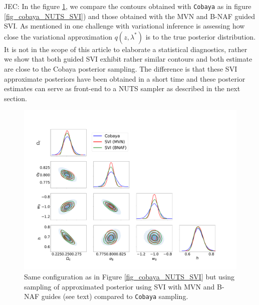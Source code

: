 \documentclass[twocolumn,twocolappendix,nofootinbib,iop]{openjournal}
\newcommand{\JEC}[1]{{\color{magenta}JEC: #1}}
\begin{document}
\JEC{
In the figure \ref{fig_cobaya_SVIs}, we compare the contours obtained with \texttt{Cobaya} as in figure \ref{fig_cobaya_NUTS_SVI}) and those obtained with the MVN and B-NAF guided SVI.  As mentioned in \cite{NEURIPS2020_7cac11e2} one challenge with variational inference is assessing how close the variational approximation $q(z,\lambda^\ast)$ is to the true posterior distribution. It is not in the scope of this article to elaborate a statistical diagnostics, rather we show that both guided SVI exhibit rather similar contours and both estimate are close to the Cobaya posterior sampling. The difference is that these SVI approximate posteriors have been obtained in a short time and these posterior estimates can serve as front-end to a NUTS sampler as described in the next section.} 
%
\begin{figure}
\centering
\includegraphics[width=1.5\columnwidth]{figures/fig_Cobaya_SVIs_v1.pdf}
\caption{Same configuration as in Figure \ref{fig_cobaya_NUTS_SVI} but using sampling of approximated posterior using SVI with MVN and B-NAF guides (see text) compared to \texttt{Cobaya} sampling.}
\label{fig_cobaya_SVIs}
\end{figure}
%
\end{document}
